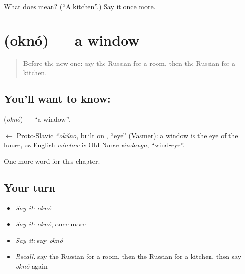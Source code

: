 \begin{tcolorbox}[breakable,colback=teal!4,colframe=teal!35!black,title={Before you move on}]
What does  mean? (\textquotedblleft{}A kitchen\textquotedblright{}.) Say it once more.
\end{tcolorbox}
\section[\texorpdfstring{\ru{окно} (oknó)}{окно (oknó)}]{ (oknó) — a window}

\label{lesson:RU-C48-window}



\begin{quote}
Before the new one: say the Russian for a room, then the Russian for a kitchen.
\end{quote}

\subsection*{You'll want to know: }
\textbf{} (\emph{oknó}) — \textquotedblleft{}a window\textquotedblright{}.

\begin{cousinweb}
\textbf{} $\leftarrow$ Proto-Slavic \emph{*okŭno}, built on \emph{}, \textquotedblleft{}eye\textquotedblright{} (Vasmer): a window is the eye of the house, as English \emph{window} is Old Norse \emph{vindauga}, \textquotedblleft{}wind-eye\textquotedblright{}.
\end{cousinweb}

\begin{grammarlens}[title={What you've built}]
One more word for this chapter.
\end{grammarlens}

\subsection*{Your turn}
\begin{itemize}
\raggedright
  \item \emph{Say it:} \emph{oknó}
  \item \emph{Say it:} \emph{oknó}, once more
  \item \emph{Say it:} say \emph{oknó}
  \item \emph{Recall:} say the Russian for a room, then the Russian for a kitchen, then say \emph{oknó} again
\end{itemize}

